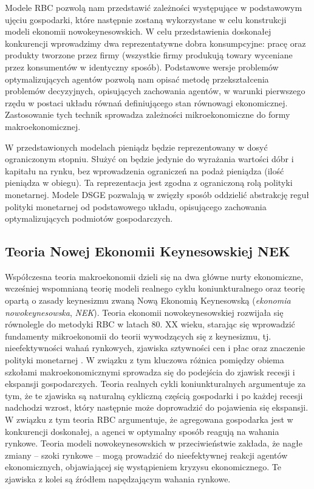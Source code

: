 Modele RBC pozwolą nam przedstawić zależności występujące w podstawowym ujęciu gospodarki, które następnie zostaną wykorzystane w celu konstrukcji modeli ekonomii nowokeynesowskich. W celu przedstawienia doskonałej konkurencji wprowadzimy dwa reprezentatywne dobra konsumpcyjne: pracę oraz produkty tworzone przez firmy (wszystkie firmy produkują towary wyceniane przez konsumentów w identyczny sposób). Podstawowe wersje problemów optymalizujących agentów pozwolą nam opisać metodę przekształcenia problemów decyzyjnych, opisujących zachowania agentów, w warunki pierwszego rzędu w postaci układu równań definiującego stan równowagi ekonomicznej. Zastosowanie tych technik sprowadza zależności mikroekonomiczne do formy makroekonomicznej.

W przedstawionych modelach pieniądz będzie reprezentowany w dosyć ograniczonym stopniu. Służyć on będzie jedynie do wyrażania wartości dóbr i kapitału na rynku, bez wprowadzenia ograniczeń na podaż pieniądza (ilość pieniądza w obiegu). Ta reprezentacja jest zgodna z ograniczoną rolą polityki monetarnej. Modele DSGE pozwalają w zwięzły sposób oddzielić abstrakcję reguł polityki monetarnej od podstawowego układu, opisującego zachowania optymalizujących podmiotów gospodarczych.

\subsection{Teoria Nowej Ekonomii Keynesowskiej NEK}

Współczesna teoria makroekonomii dzieli się na dwa główne nurty ekonomiczne, wcześniej wspomnianą teorię modeli realnego cyklu koniunkturalnego oraz teorię opartą o zasady keynesizmu zwaną Nową Ekonomią Keynesowską (\emph{ekonomia nowokeynesowska}, \emph{NEK})\cite{costaBook}. Teoria ekonomii nowokeynesowskiej rozwijała się równolegle do metodyki RBC w latach 80. XX wieku, starając się wprowadzić fundamenty mikroekonomii do teorii wywodzących się z keynesizmu, tj. nieefektywności wahań rynkowych, zjawiska sztywności cen i płac oraz znaczenie polityki monetarnej \cite{gali_gertler}. W związku z tym kluczowa różnica pomiędzy obiema szkołami makroekonomicznymi sprowadza się do podejścia do zjawisk recesji i ekspansji gospodarczych. Teoria realnych cykli koniunkturalnych argumentuje za tym, że te zjawiska są naturalną cykliczną częścią gospodarki i po każdej recesji nadchodzi wzrost, który następnie może doprowadzić do pojawienia się ekspansji. W związku z tym teoria RBC argumentuje, że agregowana gospodarka jest w konkurencji doskonałej, a agenci w optymalny sposób reagują na wahania rynkowe. Teoria modeli nowokeynesowskich w przeciwieństwie zakłada, że nagłe zmiany -- szoki rynkowe -- mogą prowadzić do nieefektywnej reakcji agentów ekonomicznych, objawiającej się wystąpieniem kryzysu ekonomicznego. Te zjawiska z kolei są źródłem napędzającym wahania rynkowe.

